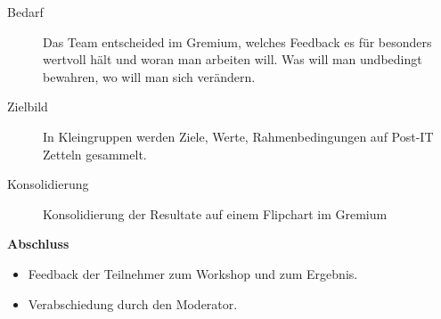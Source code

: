 \documentclass{article}
\begin{document}
\begin{description}
  \item[Bedarf] \noindent Das Team entscheided im Gremium, welches Feedback es für besonders wertvoll hält und woran man arbeiten will. Was will man undbedingt bewahren, wo will man sich verändern.
  \item[Zielbild] \noindent In Kleingruppen werden Ziele, Werte, Rahmenbedingungen auf Post-IT Zetteln gesammelt.
  \item[Konsolidierung] \noindent Konsolidierung der Resultate auf einem Flipchart im Gremium
\end{description}

\noindent\textbf{Abschluss}
\begin{itemize}
  \item[] Feedback der Teilnehmer zum Workshop und zum Ergebnis.
  \item[] Verabschiedung durch den Moderator.
\end{itemize}
\end{document}
